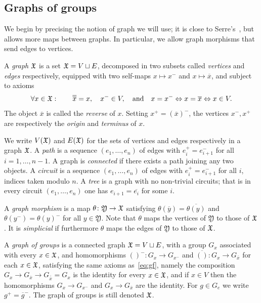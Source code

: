 \documentclass{amsart}
\begin{document}
\subsection{Graphs of groups}
\label{ss:GrOfGr}
We begin by precising the notion of graph we will use; it is close to
Serre's~\cite{serre:trees}, but allows more maps between graphs. In
particular, we allow graph morphisms that send edges to vertices.
\begin{defn}[Graphs]
\label{defi:Graph}
  A \emph{graph} ${\mathfrak X}$ is a set ${\mathfrak X}=V\sqcup E$,
  decomposed in two subsets called \emph{vertices} and \emph{edges}
  respectively, equipped with two self-maps $x\mapsto x^-$ and
  $x\mapsto\overline x$, and subject to axioms
  \begin{equation}\label{eq:gf}
    \forall x\in{\mathfrak X}:\qquad\overline{\overline x}=x,\quad x^-\in V,\quad
    \text{and}\quad x=x^-\Leftrightarrow x=\overline x\Leftrightarrow x\in V.
  \end{equation}
  The object $\overline x$ is called the \emph{reverse} of
  $x$. Setting $x^+=(\overline x)^-$, the vertices $x^-,x^+$ are
  respectively the \emph{origin} and \emph{terminus} of $x$.
\end{defn}

We write $V({\mathfrak X})$ and $E({\mathfrak X})$ for the sets of vertices and edges
respectively in a graph ${\mathfrak X}$. A \emph{path} is a sequence
$(e_1,\dots,e_n)$ of edges with $e_i^+=e_{i+1}^-$ for all
$i=1,\dots,n-1$. A graph is \emph{connected} if there exists a path joining
any two objects. A \emph{circuit} is a sequence $(e_1,\dots,e_n)$ of edges
with $e_i^+=e_{i+1}^-$ for all $i$, indices taken modulo $n$. A \emph{tree}
is a graph with no non-trivial circuits; that is in every circuit
$(e_1,\dots,e_n)$ one has $e_{i+1}=\overline{e_i}$ for some $i$.

A \emph{graph morphism} is a map $\theta\colon\mathfrak Y\to{\mathfrak X}$ satisfying
$\theta(\overline y)=\overline{\theta(y)}$ and
$\theta(y^-)=\theta(y)^-$ for all $y\in\mathfrak Y$. Note that $\theta$
maps the vertices of $\mathfrak Y$ to those of ${\mathfrak X}$. It is
\emph{simplicial} if furthermore $\theta$ maps the edges of $\mathfrak
Y$ to those of ${\mathfrak X}$.

A \emph{graph of groups} is a connected graph ${\mathfrak X}=V\sqcup E$, with a
group $G_x$ associated with every $x\in{\mathfrak X}$, and homomorphisms
$()^-\colon G_x\to G_{x^-}$ and $\overline{()}\colon G_x\to G_{\overline x}$ for
each $x\in{\mathfrak X}$, satisfying the same axioms as~\eqref{eq:gf}, namely
the composition $G_x\to G_{\overline x}\to G_{\overline{\overline
    x}}=G_x$ is the identity for every $x\in{\mathfrak X}$, and if $x\in V$ then
the homomorphisms $G_x\to G_{x^-}$ and $G_x\to G_{\overline x}$ are
the identity. For $g\in G_e$ we write $g^+={\overline g}^-$. The graph
of groups is still denoted ${\mathfrak X}$.
\end{document}
